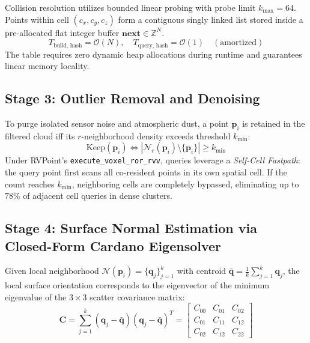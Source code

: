 \documentclass[journal,compsoc]{IEEEtran}
\begin{document}
Collision resolution utilizes bounded linear probing with probe limit $k_{\max} = 64$. Points within cell $(c_x, c_y, c_z)$ form a contiguous singly linked list stored inside a pre-allocated flat integer buffer $\mathbf{next} \in \mathbb{Z}^N$.
\begin{equation}
T_{\text{build, hash}} = \mathcal{O}(N), \quad T_{\text{query, hash}} = \mathcal{O}(1) \quad (\text{amortized})
\end{equation}
The table requires zero dynamic heap allocations during runtime and guarantees linear memory locality.

\subsection{Stage 3: Outlier Removal and Denoising}
\label{sec:outlier_filter}

To purge isolated sensor noise and atmospheric dust, a point $\bm{p}_i$ is retained in the filtered cloud iff its $r$-neighborhood density exceeds threshold $k_{\min}$:
\begin{equation}
\text{Keep}(\bm{p}_i) \iff \left| \mathcal{N}_r(\bm{p}_i) \setminus \{\bm{p}_i\} \right| \ge k_{\min}
\label{eq:ror_predicate}
\end{equation}
Under RVPoint's \texttt{execute\_voxel\_ror\_rvv}, queries leverage a \textit{Self-Cell Fastpath}: the query point first scans all co-resident points in its own spatial cell. If the count reaches $k_{\min}$, neighboring cells are completely bypassed, eliminating up to $78\%$ of adjacent cell queries in dense clusters.

\subsection{Stage 4: Surface Normal Estimation via Closed-Form Cardano Eigensolver}
\label{sec:normals}

Given local neighborhood $\mathcal{N}(\bm{p}_i) = \{\bm{q}_j\}_{j=1}^k$ with centroid $\bar{\bm{q}} = \frac{1}{k}\sum_{j=1}^k \bm{q}_j$, the local surface orientation corresponds to the eigenvector of the minimum eigenvalue of the $3 \times 3$ scatter covariance matrix:
\begin{equation}
\mathbf{C} = \sum_{j=1}^k (\bm{q}_j - \bar{\bm{q}})(\bm{q}_j - \bar{\bm{q}})^T = \begin{bmatrix} C_{00} & C_{01} & C_{02} \\ C_{01} & C_{11} & C_{12} \\ C_{02} & C_{12} & C_{22} \end{bmatrix}
\label{eq:covariance_matrix}
\end{equation}
\end{document}
